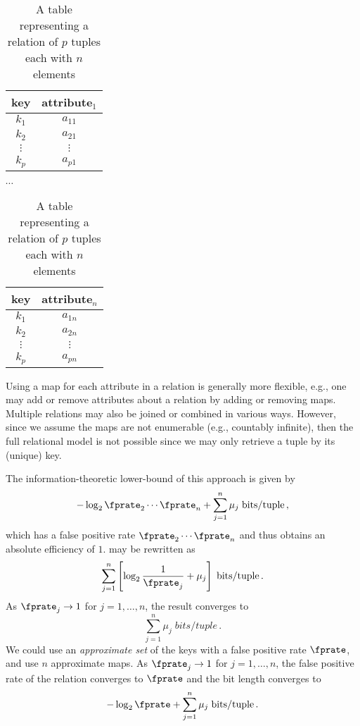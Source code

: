 \documentclass[ ../main.tex]{subfiles}
\begin{document}
\begin{table}[h]
\centering
\caption{A table representing a relation of $p$ tuples each with $n$ elements}
\label{tbl:relation2}
\begin{tabular}{|c c|} 
\hline
key & attribute$_1$\\
\hline
    $k_1$ & $a_{1 1}$\\
    $k_2$ & $a_{2 1}$\\
    $\vdots$ & $\vdots$\\
    $k_p$ & $a_{p 1}$\\
\hline
\end{tabular}
$\cdots$
\begin{tabular}{|c c|} 
\hline
key & attribute$_n$\\
\hline
    $k_1$ & $a_{1 n}$\\
    $k_2$ & $a_{2 n}$\\
    $\vdots$ & $\vdots$\\
    $k_p$ & $a_{p n}$\\
\hline
\end{tabular}
\end{table}

Using a map for each attribute in a relation is generally more flexible, e.g., one may add or remove attributes about a relation by adding or removing maps. Multiple relations may also be joined or combined in various ways. However, since we assume the maps are not enumerable (e.g., countably infinite), then the full relational model is not possible since we may only retrieve a tuple by its (unique) key.

The information-theoretic lower-bound of this approach is given by
\begin{equation}
\label{eq:lb_join}
    -\log_2 \fprate_2 \cdots \fprate_n + \sum_{j=1}^{n} \mu_j \; \si{bits \per tuple}\,,
\end{equation}
which has a false positive rate $\fprate_2 \cdots \fprate_n$ and thus obtains an absolute efficiency of $1$.  may be rewritten as
\begin{equation}
    \sum_{j=1}^{n} \left[\log_2 \frac{1}{\fprate_j} + \mu_j\right] \; \si{bits \per tuple}\,.
\end{equation}
As $\fprate_j \to 1$ for $j=1,\ldots,n$, the result converges to
\begin{equation}
    \sum_{j=1}^{n} \mu_j \; \si{bits \per tuple}\,.
\end{equation}
We could use an \emph{approximate set}\cite{aset} of the keys with a false positive rate $\fprate$, and use $n$ approximate maps. As $\fprate_j \to 1$ for $j=1,\ldots,n$, the false positive rate of the relation converges to $\fprate$ and the bit length converges to
\begin{equation}
    -\log_2 \fprate + \sum_{j=1}^{n} \mu_j \; \si{bits \per tuple}\,.
\end{equation}
\end{document}
